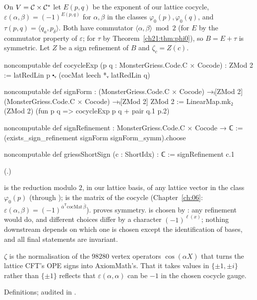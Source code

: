 \begin{definition}\label{ch21:def:griessShortSign}
On $V=\mathcal{C}\times\mathcal{C}^*$ let $E(p,q)$ be the exponent of our lattice cocycle,
$\varepsilon(\alpha,\beta)=(-1)^{E(p,q)}$ for $\alpha,\beta$ in the classes $\varphi_0(p),\varphi_0(q)$,
and $\tau(p,q)=\langle q_a,p_\delta\rangle$.  Both have commutator $\langle\alpha,\beta\rangle\bmod2$
(for $E$ by the commutator property of $\varepsilon$; for $\tau$ by Theorem~\ref{ch21:thm:phi0}), so
$B=E+\tau$ is symmetric.  Let $Z$ be a sign refinement of $B$ and $\zeta_c=Z(c)$.
\end{definition}
\begin{leancode}
noncomputable def cocycleExp (p q : MonsterGriess.Code.C × Cocode) : ZMod 2 :=
  latRedLin p ⬝ᵥ (cocMat leech *ᵥ latRedLin q)
\end{leancode}
\begin{leancode}
noncomputable def signForm :
    (MonsterGriess.Code.C × Cocode) →ₗ[ZMod 2] (MonsterGriess.Code.C × Cocode) →ₗ[ZMod 2] ZMod 2 :=
  LinearMap.mk₂ (ZMod 2) (fun p q => cocycleExp p q + pair q.1 p.2)
\end{leancode}
\begin{leancode}
noncomputable def signRefinement : MonsterGriess.Code.C × Cocode → ℂ :=
  (exists_sign_refinement signForm signForm_symm).choose
\end{leancode}
\begin{leancode}
noncomputable def griessShortSign (c : ShortIdx) : ℂ := signRefinement c.1
\end{leancode}
(.)
\begin{dictionary}
 is the reduction modulo $2$, in our lattice basis, of any lattice vector in the
class $\varphi_0(p)$ (through );  is the matrix of the cocycle
(Chapter~\ref{ch:06}: $\varepsilon(\alpha,\beta)=(-1)^{\bar\alpha^{\mathsf T}\mathrm{cocMat}\,\bar\beta}$).
 proves symmetry.   is chosen by : any
refinement would do, and different choices differ by a character $(-1)^{\ell(x)}$; nothing downstream
depends on which one is chosen except the identification of bases, and all final statements are
invariant.
\end{dictionary}
\begin{physics}
$\zeta$ is the normalisation of the $98280$ vertex operators $\cos(\alpha X)$ that turns the lattice
CFT's OPE signs into AxiomMath's.  That it takes values in $\{\pm1,\pm i\}$ rather than $\{\pm1\}$
reflects that $\varepsilon(\alpha,\alpha)$ can be $-1$ in the chosen cocycle gauge.
\end{physics}
\begin{status}
Definitions; audited in .
\end{status}

